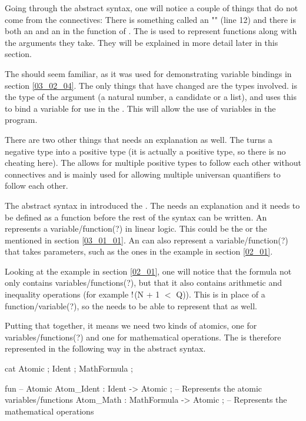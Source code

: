 Going through the abstract syntax, one will notice a couple of things that do not come from the connectives: There is something called an "" (line 12) and there is both an  and an  in the function of . The  is used to represent functions along with the arguments they take. They will be explained in more detail later in this section.

The  should seem familiar, as it was used for demonstrating variable bindings in section \ref{03_02_04}. The only things that have changed are the types involved.  is the type of the argument (a natural number, a candidate or a list), and  uses this  to bind a variable for use in the . This will allow the use of variables in the program.

There are two other things that needs an explanation as well. The  turns a negative type into a positive type (it is actually a positive type, so there is no cheating here). The  allows for multiple positive types to follow each other without connectives and is mainly used for allowing multiple universan quantifiers to follow each other.

The abstract syntax in  introduced the . The  needs an explanation and it needs to be defined as a function before the rest of the syntax can be written. An  represents a variable/function(?) in linear logic. This could be the  or the  mentioned in section \ref{03_01_01}. An  can also represent a variable/function(?) that takes parameters, such as the ones in the example in section \ref{02_01}.

Looking at the example in section \ref{02_01}, one will notice that the formula not only contains variables/functions(?), but that it also contains arithmetic and inequality operations (for example  $\mathord{\text{\rm !}}$(N + 1 $<$ Q)). This is in place of a function/variable(?), so the  needs to be able to represent that as well.

Putting that together, it means we need two kinds of atomics, one for variables/functions(?) and one for mathematical operations. The  is therefore represented in the following way in the abstract syntax.

\begin{lstgf}
    cat
        Atomic ; Ident ; MathFormula ;

    fun
        -- Atomic
        Atom_Ident : Ident -> Atomic ;          -- Represents the atomic variables/functions
        Atom_Math : MathFormula -> Atomic ;     -- Represents the mathematical operations
\end{lstgf}

